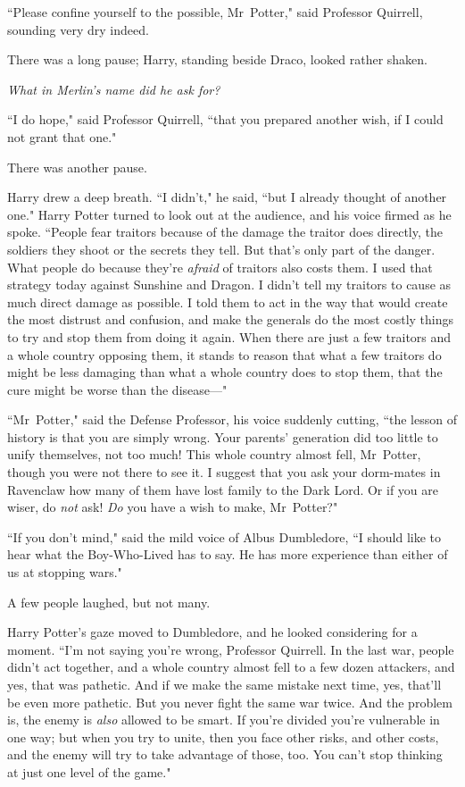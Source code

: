 ``Please confine yourself to the possible, Mr~Potter," said Professor Quirrell, sounding very dry indeed.

There was a long pause; Harry, standing beside Draco, looked rather shaken.

\emph{What in Merlin's name did he ask for?}

``I do hope," said Professor Quirrell, ``that you prepared another wish, if I could not grant that one."

There was another pause.

Harry drew a deep breath. ``I didn't," he said, ``but I already thought of another one." Harry Potter turned to look out at the audience, and his voice firmed as he spoke. ``People fear traitors because of the damage the traitor does directly, the soldiers they shoot or the secrets they tell. But that's only part of the danger. What people do because they're \emph{afraid} of traitors also costs them. I used that strategy today against Sunshine and Dragon. I didn't tell my traitors to cause as much direct damage as possible. I told them to act in the way that would create the most distrust and confusion, and make the generals do the most costly things to try and stop them from doing it again. When there are just a few traitors and a whole country opposing them, it stands to reason that what a few traitors do might be less damaging than what a whole country does to stop them, that the cure might be worse than the disease—"

``Mr~Potter," said the Defense Professor, his voice suddenly cutting, ``the lesson of history is that you are simply wrong. Your parents' generation did too little to unify themselves, not too much! This whole country almost fell, Mr~Potter, though you were not there to see it. I suggest that you ask your dorm-mates in Ravenclaw how many of them have lost family to the Dark Lord. Or if you are wiser, do \emph{not} ask! \emph{Do} you have a wish to make, Mr~Potter?"

``If you don't mind," said the mild voice of Albus Dumbledore, ``I should like to hear what the Boy-Who-Lived has to say. He has more experience than either of us at stopping wars."

A few people laughed, but not many.

Harry Potter's gaze moved to Dumbledore, and he looked considering for a moment. ``I'm not saying you're wrong, Professor Quirrell. In the last war, people didn't act together, and a whole country almost fell to a few dozen attackers, and yes, that was pathetic. And if we make the same mistake next time, yes, that'll be even more pathetic. But you never fight the same war twice. And the problem is, the enemy is \emph{also} allowed to be smart. If you're divided you're vulnerable in one way; but when you try to unite, then you face other risks, and other costs, and the enemy will try to take advantage of those, too. You can't stop thinking at just one level of the game."

